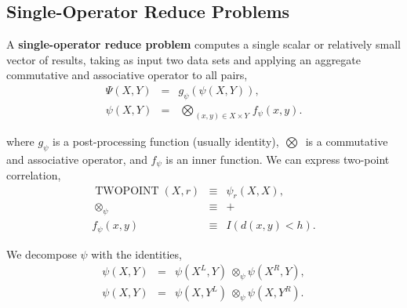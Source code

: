 \documentclass[times, leqno,twocolumn]{article}
\DeclareMathOperator{\TWOPT}{TWOPOINT}
\newcommand{\defterm}[1]{{\bf #1}}
\newcommand{\kdleft}[1]{#1^{\!L}}
\newcommand{\kdright}[1]{#1^{\!R}}
\newcommand{\nameOp}[2]{\mathop{#1\nolimits\!\!_{#2}}}
\newcommand{\nameop}[2]{{\scriptstyle\:}#1_{\!#2}}
\newcommand{\myOp}[1]{\nameOp{\bigotimes}{#1}}
\newcommand{\myop}[1]{\nameop{\otimes}{#1}}
\newcommand{\letterglob}{\psi}
\newcommand{\outglob}{\Psi}
\newcommand{\inglob}{\psi}
\newcommand{\Opglob}{\myOp{\letterglob}}
\newcommand{\opglob}{\myop{\letterglob}}
\newcommand{\fglob}{f_{\!\letterglob}}
\newcommand{\gglob}{g_{\!\letterglob}}
\begin{document}


\subsection{Single-Operator Reduce Problems}

A \defterm{single-operator reduce problem} computes a single scalar or relatively small vector of results, taking as input two data sets and applying an aggregate commutative and associative operator to all pairs,
\begin{eqnarray*}
\outglob(X, Y) &=& \gglob(\inglob(X, Y)),
\\
\inglob(X, Y) &=& \Opglob_{(x, y) \in X \times Y} \fglob(x, y).
\label{eqn:defglob}
\end{eqnarray*}

\noindent where $\gglob$ is a post-processing function (usually identity), $\Opglob$ is a commutative and associative operator, and $\fglob$ is an inner function.
We can express two-point correlation,
\[\begin{array}{rcl}
\TWOPT(X, r) &\equiv& \inglob_r(X, X),
\\
\opglob &\equiv& +
\\
\fglob(x, y) &\equiv& I(d(x, y) < h).
\end{array}\]

\noindent We decompose $\inglob$ with the identities,
\begin{eqnarray*}
\inglob(X, Y) &=& \inglob(\kdleft{X}, Y) \opglob \inglob(\kdright{X}, Y),
\\
\inglob(X, Y) &=& \inglob(X, \kdleft{Y}) \opglob \inglob(X, \kdright{Y}).
\label{eqn:divideglob}
\end{eqnarray*}
\end{document}
